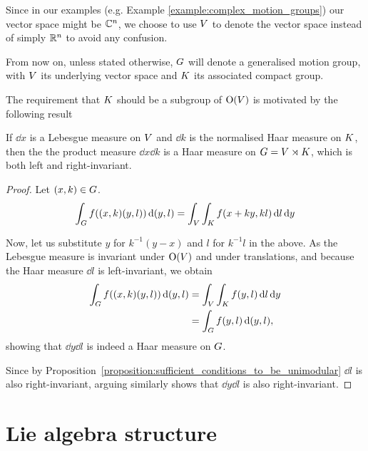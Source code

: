 \begin{remark}
    Since in our examples (e.g. Example \ref{example:complex_motion_groups}) our vector space might be $\mathbb{C}^n$,
    we choose to use $V$ to denote the vector space instead of simply $\mathbb{R}^n$ to avoid any confusion.
\end{remark}

From now on, unless stated otherwise,
$G$ will denote a generalised motion group,
with $V$ its underlying vector space and $K$ its associated compact group.

The requirement that $K$ should be a subgroup of ${\mathrm{O} (V)}$ is motivated by the following result

\begin{lemma}
\label{lemma:Haar_measure}
    If $\dd x$ is a Lebesgue measure on $V$ and $\dd k$ is the normalised Haar measure on $K$,
    then the the product measure $\dd x \dd k$ is a Haar measure on $G = V \rtimes K$,
    which is both left and right-invariant.
\end{lemma}
\begin{proof}
    Let $(x, k) \in G$.
    \begin{align*}
        \int_G f((x, k) (y, l)) \,\mathrm{d} (y, l)
        = \int_V \int_K f(x + ky, k l) \,\mathrm{d} l \,\mathrm{d} y
    \end{align*}

    Now, let us substitute $y$ for $k^{-1}(y - x)$ and $l$ for $k^{-1} l$ in the above.
    As the Lebesgue measure is invariant under ${\mathrm{O} (V)}$ and under translations,
    and because the Haar measure $\dd l$ is left-invariant,
    we obtain
    \begin{align*}
        \int_G f((x, k) (y, l)) \,\mathrm{d} (y, l)
        &= \int_V \int_K f(y, l) \,\mathrm{d} l \,\mathrm{d} y\\
        &= \int_G f(y, l) \,\mathrm{d} (y, l),
    \end{align*}
    showing that $\dd y \dd l$ is indeed a Haar measure on $G$.

    Since by Proposition~\ref{proposition:sufficient_conditions_to_be_unimodular} $\dd l$ is also right-invariant,
    arguing similarly shows that $\dd y \dd l$ is also right-invariant.
\end{proof}

\section{Lie algebra structure}

